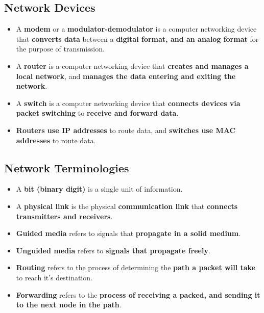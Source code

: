 \documentclass[16pt]{article}
\begin{document}
    \subsection*{Network Devices}
    \begin{itemize}
        \item A \textbf{modem} or a \textbf{modulator-demodulator} is a computer networking device that \textbf{converts data} between a \textbf{digital format, and an analog format} for the purpose of transmission.
        \item A \textbf{router} is a computer networking device that \textbf{creates and manages a local network}, and \textbf{manages the data entering and exiting the network}.
        \item A \textbf{switch} is a computer networking device that \textbf{connects devices via packet switching} to \textbf{receive and forward data}.
        \item \textbf{Routers use IP addresses} to route data, and \textbf{switches use MAC addresses} to route data.
    \end{itemize}

    \subsection*{Network Terminologies}
    \begin{itemize}
        \item A \textbf{bit (binary digit)} is a single unit of information.
        \item A \textbf{physical link} is the physical \textbf{communication link} that \textbf{connects transmitters and receivers}.
        \item \textbf{Guided media} refers to signals that \textbf{propagate in a solid medium}.
        \item \textbf{Unguided media} refers to \textbf{signals that propagate freely}. 
        \item \textbf{Routing} refers to the process of determining the \textbf{path a packet will take} to reach it's destination.
        \item \textbf{Forwarding} refers to the \textbf{process of receiving a packed, and sending it to the next node in the path}. 
    \end{itemize}

\section*{}
\end{document}
